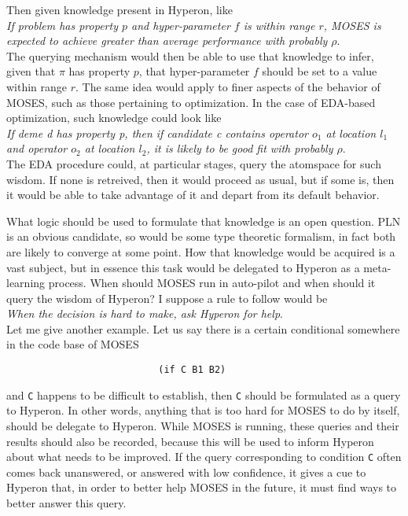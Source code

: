 \documentclass[]{report}
\begin{document}
Then given knowledge present in Hyperon, like\\

\emph{If problem has property $p$ and hyper-parameter $f$ is within
range $r$, MOSES is expected to achieve greater than average
performance with probably $\rho$}.\\

The querying mechanism would then be able to use that knowledge to
infer, given that $\pi$ has property $p$, that hyper-parameter $f$
should be set to a value within range $r$.  The same idea would apply
to finer aspects of the behavior of MOSES, such as those pertaining to
optimization.  In the case of EDA-based optimization, such knowledge
could look like\\

\emph{If deme d has property p, then if candidate c contains operator
$o_1$ at location $l_1$ and operator $o_2$ at location $l_2$, it is
likely to be good fit with probably $\rho$}.\\

The EDA procedure could, at particular stages, query the atomspace for
such wisdom.  If none is retreived, then it would proceed as usual,
but if some is, then it would be able to take advantage of it and
depart from its default behavior.

What logic should be used to formulate that knowledge is an open
question.  PLN is an obvious candidate, so would be some type
theoretic formalism, in fact both are likely to converge at some
point.  How that knowledge would be acquired is a vast subject, but in
essence this task would be delegated to Hyperon as a meta-learning
process.  When should MOSES run in auto-pilot and when should it query
the wisdom of Hyperon?  I suppose a rule to follow would be\\

\emph{When the decision is hard to make, ask Hyperon for help}.\\

Let me give another example.  Let us say there is a certain
conditional somewhere in the code base of MOSES

\begin{verbatim}
                           (if C B1 B2)
\end{verbatim}
and \texttt{C} happens to be difficult to establish, then
\texttt{C} should be formulated as a query to Hyperon.  In
other words, anything that is too hard for MOSES to do by itself,
should be delegate to Hyperon.  While MOSES is running, these queries
and their results should also be recorded, because this will be used
to inform Hyperon about what needs to be improved.  If the query
corresponding to condition \texttt{C} often comes back unanswered, or
answered with low confidence, it gives a cue to Hyperon that, in order
to better help MOSES in the future, it must find ways to better answer
this query.
\end{document}
